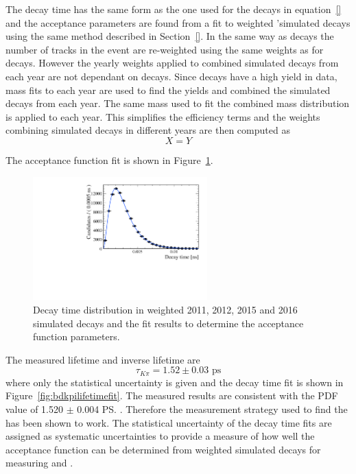 The decay time \pdf has the same form as the one used for the \bsmumu decays in equation~\ref{} and the acceptance parameters are found from a fit to weighted '\bdkpi simulated decays using the same method described in Section~\ref{}. In the same way as \bsmumu decays the number of tracks in the event are re-weighted using the same weights as for \bsmumu decays. However the yearly weights applied to combined simulated \bdkpi decays from each year are not dependant on \bsjpsiphi decays. Since \bdkpi decays have a high yield in data, mass fits to each year are used to find the yields and combined the simulated decays from each year. The same mass \pdf used to fit the combined mass distribution is applied to each year. This simplifies the efficiency terms and the weights combining simulated decays in different years are then computed as
\begin{equation}
X = Y
\end{equation}

The acceptance function fit is shown in Figure~\ref{fig:bdkpiacceptancefit}. 

\begin{figure}[htbp]
\centering
  \includegraphics[width=0.6\textwidth]{./Figs/LifetimeSystematics/Bd2KPi_acceptance_fit.pdf}
\caption{Decay time distribution in weighted 2011, 2012, 2015 and 2016 simulated decays and the \ml fit results to determine the acceptance function parameters. }
\label{fig:bdkpiacceptancefit}
\end{figure}

The measured \bdkpi lifetime and inverse lifetime are
\begin{equation}
\tau_{K\pi} = 1.52 \pm 0.03  \text{ ps} 
\end{equation}
where only the statistical uncertainty is given and the decay time fit is shown in Figure~\ref{fig:bdkpilifetimefit}. The measured results are consistent with the PDF value of 1.520 $\pm$ 0.004 \ps. Therefore the measurement strategy used to find the \bsmumu \el has been shown to work. The statistical uncertainty of the \bdkpi decay time fits are assigned as systematic uncertainties to provide a measure of how well the acceptance function can be determined from weighted simulated decays for measuring \tmumu and \Gmumu. 

